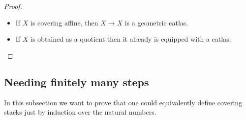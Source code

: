\begin{proof}
\begin{itemize}
	\item If 	$X$ is covering affine, then $X \to X$ is a geometric catlas. 
	\item If $X$ is obtained as a quotient then it already is equipped with a catlas. %
	
\end{itemize}
\end{proof}

\subsection{Needing finitely many steps}
In this subsection we want to prove that one could equivalently define covering stacks just by induction over the natural numbers.

